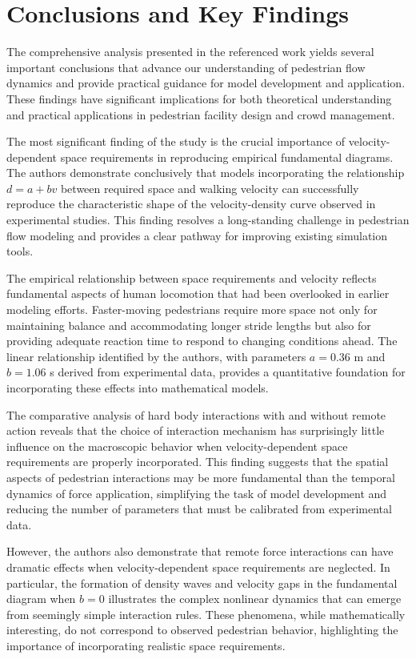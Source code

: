\documentclass[12pt,a4paper]{article}
\begin{document}
\section{Conclusions and Key Findings}

The comprehensive analysis presented in the referenced work yields several important conclusions that advance our understanding of pedestrian flow dynamics and provide practical guidance for model development and application. These findings have significant implications for both theoretical understanding and practical applications in pedestrian facility design and crowd management.

The most significant finding of the study is the crucial importance of velocity-dependent space requirements in reproducing empirical fundamental diagrams. The authors demonstrate conclusively that models incorporating the relationship $d = a + bv$ between required space and walking velocity can successfully reproduce the characteristic shape of the velocity-density curve observed in experimental studies. This finding resolves a long-standing challenge in pedestrian flow modeling and provides a clear pathway for improving existing simulation tools.

The empirical relationship between space requirements and velocity reflects fundamental aspects of human locomotion that had been overlooked in earlier modeling efforts. Faster-moving pedestrians require more space not only for maintaining balance and accommodating longer stride lengths but also for providing adequate reaction time to respond to changing conditions ahead. The linear relationship identified by the authors, with parameters $a = 0.36$ m and $b = 1.06$ s derived from experimental data, provides a quantitative foundation for incorporating these effects into mathematical models.

The comparative analysis of hard body interactions with and without remote action reveals that the choice of interaction mechanism has surprisingly little influence on the macroscopic behavior when velocity-dependent space requirements are properly incorporated. This finding suggests that the spatial aspects of pedestrian interactions may be more fundamental than the temporal dynamics of force application, simplifying the task of model development and reducing the number of parameters that must be calibrated from experimental data.

However, the authors also demonstrate that remote force interactions can have dramatic effects when velocity-dependent space requirements are neglected. In particular, the formation of density waves and velocity gaps in the fundamental diagram when $b = 0$ illustrates the complex nonlinear dynamics that can emerge from seemingly simple interaction rules. These phenomena, while mathematically interesting, do not correspond to observed pedestrian behavior, highlighting the importance of incorporating realistic space requirements.
\end{document}
